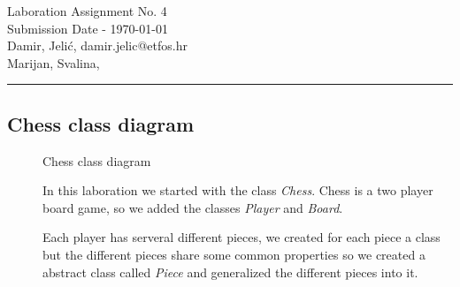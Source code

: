 \documentclass[11pt,a4paper]{article}
\begin{document}
\large
Laboration Assignment No. 4\\
Submission Date - \yyyymmdddate \today \\
Damir, Jelić, damir.jelic@etfos.hr \\
Marijan, Svalina, %
\\
\rule{\linewidth}{0.1mm}

\setcounter{section}{4}
\subsection{Chess class diagram}
\begin{figure}[htb]
    \begin{center}
        \setlength\fboxsep{0pt}
        \caption{Chess class diagram}
        \label{fig:class_diag}
    \end{center}
\end{figure}

\begin{description}
    \item[]
    In this laboration we started with the class \emph{Chess}.
    Chess is a two player board game, so we added the 
    classes \emph{Player} and \emph{Board}.
    \item[]
    Each player has serveral different pieces, we created for each piece a class
    but the different pieces share some common properties so we created a abstract class
    called \emph{Piece} and generalized the different pieces into it.
\end{description}
\end{document}
